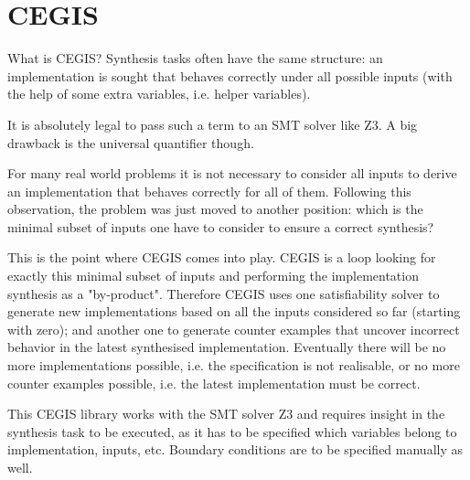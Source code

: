 \section{CEGIS}
\label{sec:cegis}

What is CEGIS?
Synthesis tasks often have the same structure: an implementation is sought that behaves correctly under all possible inputs (with the help of some extra variables, i.e. helper variables).

It is absolutely legal to pass such a term to an SMT solver like Z3. A big drawback is the universal quantifier though.

For many real world problems it is not necessary to consider all inputs to derive an implementation that behaves correctly for all of them. Following this observation, the problem was just moved to another position: which is the minimal subset of inputs one have to consider to ensure a correct synthesis?

This is the point where CEGIS comes into play. CEGIS is a loop looking for exactly this minimal subset of inputs and performing the implementation synthesis as a "by-product". Therefore CEGIS uses one satisfiability solver to generate new implementations based on all the inputs considered so far (starting with zero); and another one to generate counter examples that uncover incorrect behavior in the latest synthesised implementation. Eventually there will be no more implementations possible, i.e. the specification is not realisable, or no more counter examples possible, i.e. the latest implementation must be correct.

This CEGIS library works with the SMT solver Z3 and requires insight in the synthesis task to be executed, as it has to be specified which variables belong to implementation, inputs, etc. Boundary conditions are to be specified manually as well.
